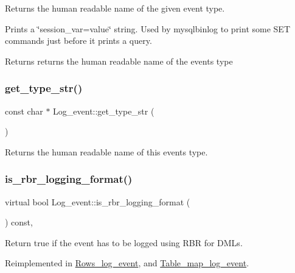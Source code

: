 Returns the human readable name of the given event type.

Prints a \char`\"{}session\+\_\+var=value\char`\"{} string. Used by mysqlbinlog to print some S\+ET commands just before it prints a query.\begin{DoxyReturn}{Returns}
returns the human readable name of the event\textquotesingle{}s type 
\end{DoxyReturn}
\mbox{\label{classLog__event_a2490b26defb775390f1d1e99b72ed0f1}} 
\subsubsection{\texorpdfstring{get\+\_\+type\+\_\+str()}{get\_type\_str()}\hspace{0.1cm}{\footnotesize\ttfamily [2/2]}}
{\footnotesize\ttfamily const char $\ast$ Log\+\_\+event\+::get\+\_\+type\+\_\+str (\begin{DoxyParamCaption}{ }\end{DoxyParamCaption})}

Returns the human readable name of this event\textquotesingle{}s type. \mbox{\label{classLog__event_abd996ad9f33a59c3b03737beb2c2869d}} 
\subsubsection{\texorpdfstring{is\+\_\+rbr\+\_\+logging\+\_\+format()}{is\_rbr\_logging\_format()}}
{\footnotesize\ttfamily virtual bool Log\+\_\+event\+::is\+\_\+rbr\+\_\+logging\+\_\+format (\begin{DoxyParamCaption}{ }\end{DoxyParamCaption}) const\hspace{0.3cm}{\ttfamily [inline]}, {\ttfamily [virtual]}}

Return true if the event has to be logged using R\+BR for D\+M\+Ls. 

Reimplemented in \mbox{\hyperlink{classRows__log__event_a6e9443d09dd4aad9e689f962ba29abfd}{Rows\+\_\+log\+\_\+event}}, and \mbox{\hyperlink{classTable__map__log__event_ab810d5c553584af2edf7fcaa3308fc77}{Table\+\_\+map\+\_\+log\+\_\+event}}.

